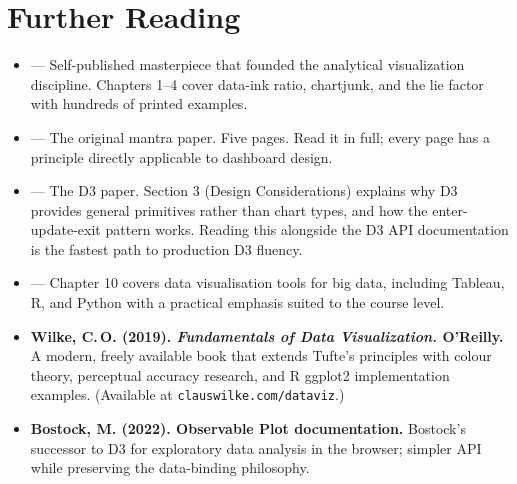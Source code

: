 \section*{Further Reading}
\label{sec:ch9-further}

\begin{itemize}
  \item \textbf{\cite{Tufte1983}} --- Self-published masterpiece that
        founded the analytical visualization discipline. Chapters 1--4
        cover data-ink ratio, chartjunk, and the lie factor with
        hundreds of printed examples.
  \item \textbf{\cite{Shneiderman1996}} --- The original mantra paper.
        Five pages. Read it in full; every page has a principle directly
        applicable to dashboard design.
  \item \textbf{\cite{Bostock2011}} --- The D3 paper. Section 3 (Design
        Considerations) explains why D3 provides general primitives rather
        than chart types, and how the enter-update-exit pattern works.
        Reading this alongside the D3 API documentation is the fastest
        path to production D3 fluency.
  \item \textbf{\cite{Acharya2015}} --- Chapter 10 covers data
        visualisation tools for big data, including Tableau, R, and Python
        with a practical emphasis suited to the course level.
  \item \textbf{Wilke, C.\,O. (2019). \textit{Fundamentals of Data
        Visualization.} O'Reilly.} A modern, freely available book that
        extends Tufte's principles with colour theory, perceptual accuracy
        research, and R ggplot2 implementation examples.
        (Available at \texttt{clauswilke.com/dataviz}.)
  \item \textbf{Bostock, M. (2022). Observable Plot documentation.}
        Bostock's successor to D3 for exploratory data analysis in the
        browser; simpler API while preserving the data-binding philosophy.
\end{itemize}
